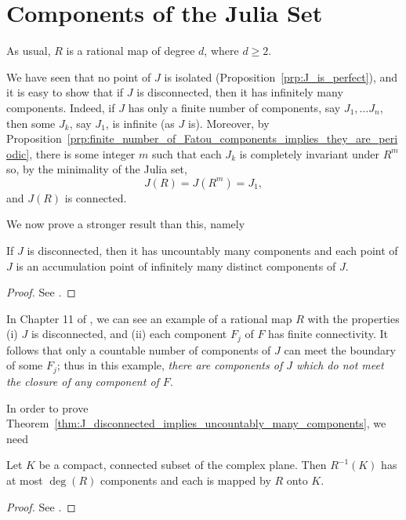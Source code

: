 \section{Components of the Julia Set}

As usual, $R$ is a rational map of degree $d$, where $d \geq 2$.

\begin{remark}
    We have seen that no point of $J$ is isolated
    (Proposition~\ref{prp:J_is_perfect}), and it is easy to show that if $J$ is
    disconnected, then it has infinitely many components. Indeed, if $J$ has
    only a finite number of components, say $J_1, \dots J_n$, then some $J_k$,
    say $J_1$, is infinite (as $J$ is). Moreover, by
    Proposition~\ref{prp:finite_number_of_Fatou_components_implies_they_are_periodic},
    there is some integer $m$ such that each $J_k$ is completely invariant under
    $R^m$ so, by the minimality of the Julia set,
    \begin{equation*}
        J(R) = J(R^m) = J_1,
    \end{equation*}
    and $J(R)$ is connected.
\end{remark}

We now prove a stronger result than this, namely

\begin{theorem}
    \label{thm:J_disconnected_implies_uncountably_many_components}
    If $J$ is disconnected, then it has uncountably many components and each
    point of $J$ is an accumulation point of infinitely many distinct components
    of $J$.
\end{theorem}
\begin{proof}
    See \cite[95--96]{Beardon1991}.
\end{proof}

In Chapter 11 of \cite{Beardon1991}, we can see an example of a rational map $R$
with the properties (i) $J$ is disconnected, and (ii) each component $F_j$ of
$F$ has finite connectivity. It follows that only a countable number of
components of $J$ can meet the boundary of some $F_j$; thus in this example,
\emph{there are components of $J$ which do not meet the closure of any component
of $F$}.

In order to prove
Theorem~\ref{thm:J_disconnected_implies_uncountably_many_components}, we need

\begin{lemma}
    Let $K$ be a compact, connected subset of the complex plane. Then
    $R^{-1}(K)$ has at most $\deg(R)$ components and each is mapped by $R$ onto
    $K$.
\end{lemma}
\begin{proof}
    See \cite[96--98]{Beardon1991}.
\end{proof}